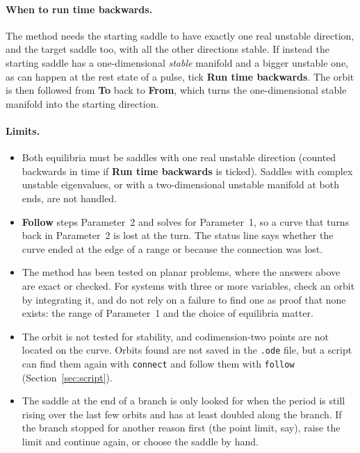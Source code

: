 \documentclass[11pt,a4paper]{article}
\newcommand{\ui}[1]{\textsf{\textbf{#1}}}          %
\begin{document}
\paragraph{When to run time backwards.} The method needs the starting saddle to have exactly one real unstable direction, and the target saddle too, with all the other directions stable. If instead the starting saddle has a one-dimensional \emph{stable} manifold and a bigger unstable one, as can happen at the rest state of a pulse, tick \ui{Run time backwards}. The orbit is then followed from \ui{To} back to \ui{From}, which turns the one-dimensional stable manifold into the starting direction.

\paragraph{Limits.}
\begin{itemize}
  \item Both equilibria must be saddles with one real unstable direction (counted backwards in time if \ui{Run time backwards} is ticked). Saddles with complex unstable eigenvalues, or with a two-dimensional unstable manifold at both ends, are not handled.
  \item \ui{Follow} steps Parameter~2 and solves for Parameter~1, so a curve that turns back in Parameter~2 is lost at the turn. The status line says whether the curve ended at the edge of a range or because the connection was lost.
  \item The method has been tested on planar problems, where the answers above are exact or checked. For systems with three or more variables, check an orbit by integrating it, and do not rely on a failure to find one as proof that none exists: the range of Parameter~1 and the choice of equilibria matter.
  \item The orbit is not tested for stability, and codimension-two points are not located on the curve. Orbits found are not saved in the \texttt{.ode} file, but a script can find them again with \texttt{connect} and follow them with \texttt{follow} (Section~\ref{sec:script}).
  \item The saddle at the end of a branch is only looked for when the period is still rising over the last few orbits and has at least doubled along the branch. If the branch stopped for another reason first (the point limit, say), raise the limit and continue again, or choose the saddle by hand.
\end{itemize}
\end{document}
